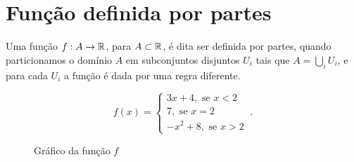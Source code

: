 \chapter{Função definida por partes}

\begin{obs}
Uma função $f: A \to \mathbb{R}$, para $A \subset \mathbb{R}$, é dita ser definida por partes, quando particionamos o domínio $A$ em subconjuntos disjuntos $U_i$ tais que $A= \bigcup_{i}U_i$, e para cada $U_i$ a função é dada por uma regra diferente. 
\end{obs}

\begin{exem}
\begin{equation*}
f(x) = \begin{cases}
                 3x + 4, \text{ se } x < 2 \\
                 7 , \text{ se } x = 2 \\
                 -x^2 + 8, \text{ se } x > 2
                \end{cases} \ .
\end{equation*}
   \begin{figure}[H]
  \centering
   \caption{Gráfico da função $f$}
  \end{figure}
\end{exem}

